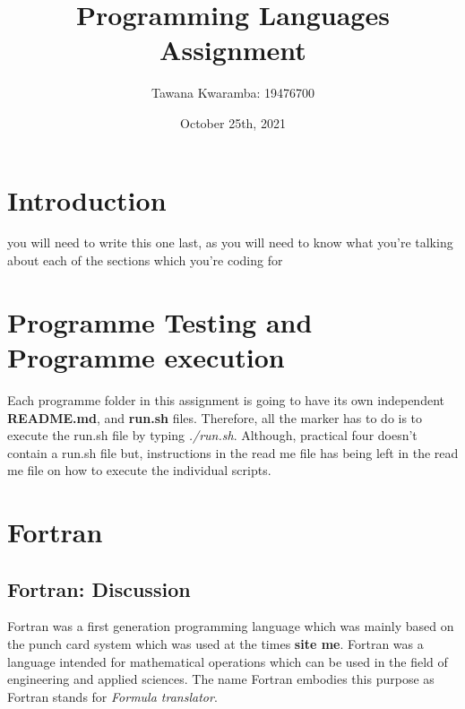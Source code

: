 \documentclass[
	12pt, %
]{fphw}
\title{Programming Languages Assignment} %
\author{Tawana Kwaramba: 19476700} %
\date{October 25th, 2021} %
\institute{Curtin University \\ Faculty of Science and Engineering: School of Electrical Engineering, computing and Math Science} %
\begin{document}
\maketitle
\newpage
\tableofcontents
\newpage
\listoffigures
\listoftables
\newpage

\section{Introduction}
you will need to write this one last, as you will need to know what you're
talking about each of the sections which you're coding for

\section{Programme Testing and Programme execution}
Each programme folder in this assignment is going to have its own independent
\textbf{README.md}, and \textbf{run.sh} files. Therefore, all the marker has to
do is to execute the run.sh file by typing \emph{./run.sh}. Although, practical
four doesn't contain a run.sh file but, instructions in the read me file has
being left in the read me file on how to execute the individual scripts.

\section{Fortran}

\subsection{Fortran: Discussion}
Fortran was a first generation programming language which was mainly based on
the punch card system which was used at the times \textbf{site me}.
Fortran was a language intended for mathematical operations which can be used
in the field of engineering and applied sciences. The name Fortran embodies this
purpose as Fortran stands for \emph{Formula translator}.\par
\end{document}
